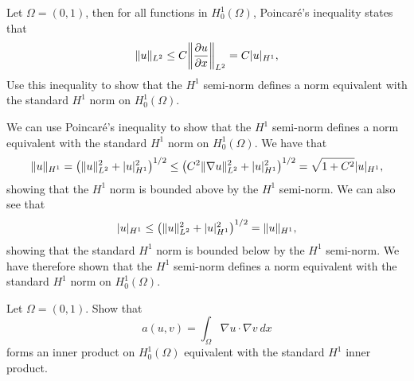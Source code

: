 \begin{exercise}
    Let $\Omega = (0, 1)$, then for all functions in $H^1_0(\Omega)$, Poincaré's inequality states that
    \begin{equation*}
        \norm{u}_{L^2} \leq C \norm*{\frac{\partial u}{\partial x}}_{L^2} = C \abs{u}_{H^1},
    \end{equation*}
    Use this inequality to show that the $H^1$ semi-norm defines a norm equivalent with the standard $H^1$ norm on $H^1_0(\Omega)$.
\end{exercise}

\begin{solution}
    We can use Poincaré's inequality to show that the $H^1$ semi-norm defines a norm equivalent with the standard $H^1$ norm on $H^1_0(\Omega)$.
    We have that
    \begin{equation*}
        \lVert u\rVert_{H^1}
        = \left( \lVert u\rVert_{L^2}^2 + \lvert u\rvert_{H^1}^2 \right)^{1/2}
        \leq \left( C^2 \lVert\nabla u\rVert_{L^2}^2 + \lvert u\rvert_{H^1}^2 \right)^{1/2}
        = \sqrt{1 + C^2} \lvert u\rvert_{H^1},
    \end{equation*}
    showing that the $H^1$ norm is bounded above by the $H^1$ semi-norm.
    We can also see that
    \begin{equation*}
        \lvert u\rvert_{H^1}
        \leq \left( \lVert u\rVert_{L^2}^2 + \lvert u\rvert_{H^1}^2 \right)^{1/2}
        = \lVert u\rVert_{H^1},
    \end{equation*}
    showing that the standard $H^1$ norm is bounded below by the $H^1$ semi-norm.
    We have therefore shown that the $H^1$ semi-norm defines a norm equivalent with the standard $H^1$ norm on $H^1_0(\Omega)$.
\end{solution}

\begin{exercise}
    Let $\Omega = (0, 1)$.
    Show that
    \begin{equation*}
        a(u, v) = \int_\Omega \nabla u \cdot \nabla v \ dx
    \end{equation*}
    forms an inner product on $H^1_0(\Omega)$ equivalent with the standard $H^1$ inner product.
\end{exercise}

